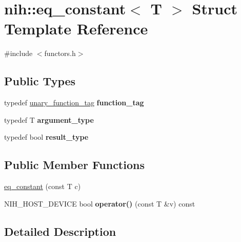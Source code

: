 \hypertarget{structnih_1_1eq__constant}{
\section{nih\-:\-:eq\-\_\-constant$<$ \-T $>$ \-Struct \-Template \-Reference}
\label{structnih_1_1eq__constant}
}


{\ttfamily \#include $<$functors.\-h$>$}

\subsection*{\-Public \-Types}
\begin{DoxyCompactItemize}
\item 
\hypertarget{structnih_1_1eq__constant_af72ac392a91f58c3b7bd03e06d567faf}{
typedef \hyperlink{structnih_1_1unary__function__tag}{unary\-\_\-function\-\_\-tag} {\bfseries function\-\_\-tag}}
\label{structnih_1_1eq__constant_af72ac392a91f58c3b7bd03e06d567faf}

\item 
\hypertarget{structnih_1_1eq__constant_ae0026578ee9bb9a76cab89cf23df33a1}{
typedef \-T {\bfseries argument\-\_\-type}}
\label{structnih_1_1eq__constant_ae0026578ee9bb9a76cab89cf23df33a1}

\item 
\hypertarget{structnih_1_1eq__constant_a243b05782bb9f8d55ae105fe32c88eb7}{
typedef bool {\bfseries result\-\_\-type}}
\label{structnih_1_1eq__constant_a243b05782bb9f8d55ae105fe32c88eb7}

\end{DoxyCompactItemize}
\subsection*{\-Public \-Member \-Functions}
\begin{DoxyCompactItemize}
\item 
\hyperlink{structnih_1_1eq__constant_a7bd188fac4c9af6a144facc1c7effbc6}{eq\-\_\-constant} (const \-T c)
\item 
\hypertarget{structnih_1_1eq__constant_a22cf361c0ab63992e1a196142a6f7729}{
\-N\-I\-H\-\_\-\-H\-O\-S\-T\-\_\-\-D\-E\-V\-I\-C\-E bool {\bfseries operator()} (const \-T \&v) const }
\label{structnih_1_1eq__constant_a22cf361c0ab63992e1a196142a6f7729}

\end{DoxyCompactItemize}


\subsection{\-Detailed \-Description}
